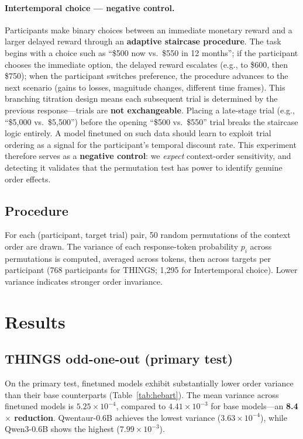 \documentclass[11pt]{article}
\begin{document}
\paragraph{Intertemporal choice \citep{ruggeri2022globalizability} --- negative control.}
Participants make binary choices between an immediate monetary reward and a larger delayed reward through an \textbf{adaptive staircase procedure}.
The task begins with a choice such as ``\$500 now vs.\ \$550 in 12 months''; if the participant chooses the immediate option, the delayed reward escalates (e.g., to \$600, then \$750); when the participant switches preference, the procedure advances to the next scenario (gains to losses, magnitude changes, different time frames).
This branching titration design means each subsequent trial is determined by the previous response---trials are \textbf{not exchangeable}.
Placing a late-stage trial (e.g., ``\$5{,}000 vs.\ \$5{,}500'') before the opening ``\$500 vs.\ \$550'' trial breaks the staircase logic entirely.
A model finetuned on such data should learn to exploit trial ordering as a signal for the participant's temporal discount rate.
This experiment therefore serves as a \textbf{negative control}: we \emph{expect} context-order sensitivity, and detecting it validates that the permutation test has power to identify genuine order effects.

\subsection{Procedure}

For each (participant, target trial) pair, 50 random permutations of the context order are drawn.
The variance of each response-token probability $p_i$ across permutations is computed, averaged across tokens, then across targets per participant (768 participants for THINGS; 1{,}295 for Intertemporal choice).
Lower variance indicates stronger order invariance.

\section{Results}

\subsection{THINGS odd-one-out (primary test)}

On the primary test, finetuned models exhibit substantially lower order variance than their base counterparts (Table~\ref{tab:hebart}).
The mean variance across finetuned models is $5.25 \times 10^{-4}$, compared to $4.41 \times 10^{-3}$ for base models---an \textbf{8.4$\boldsymbol{\times}$ reduction}.
Qwentaur-0.6B achieves the lowest variance ($3.63 \times 10^{-4}$), while Qwen3-0.6B shows the highest ($7.99 \times 10^{-3}$).
\end{document}
